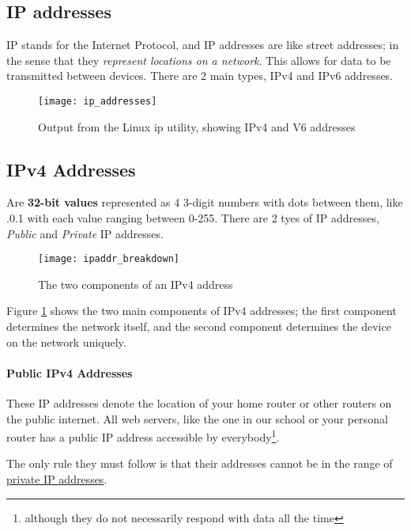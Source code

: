 \documentclass[../main.tex]{subfiles}
\begin{document}
\subsection{IP addresses}
\label{2:sec:ip}

IP stands for the Internet Protocol, and IP addresses are like street addresses; in the sense that they \emph{represent locations on a network}. This allows for data to be transmitted between devices. There are 2 main types, IPv4 and IPv6 addresses.

\begin{figure}[h]
    \centering
    \texttt{[image: ip\_addresses]}
    \caption{Output from the Linux {\ccmono ip} utility, showing IPv4 and V6 addresses}
\end{figure}

\subsection{IPv4 Addresses}

Are \textbf{32-bit values} represented as 4 3-digit numbers with dots between them, like {.0.1} with each value ranging between 0-255. There are 2 tyes of IP addresses, \emph{Public} and \emph{Private} IP addresses.

\begin{figure}[h]
    \centering
    \texttt{[image: ipaddr\_breakdown]}
    \caption{The two components of an IPv4 address}
    \label{fig:ipaddr_breakdown}
\end{figure}

Figure \ref{fig:ipaddr_breakdown} shows the two main components of IPv4 addresses; the first component determines the network itself, and the second component determines the device on the network uniquely.

\paragraph{Public IPv4 Addresses}

These IP addresses denote the location of your home router or other routers on the public internet. All web servers, like the one in our school or your personal router has a public IP address accessible by everybody\footnote{although they do not necessarily respond with data all the time}.

The only rule they must follow is that their addresses cannot be in the range of \hyperref[tab:private_ip_classes]{private IP addresses}.
\end{document}
